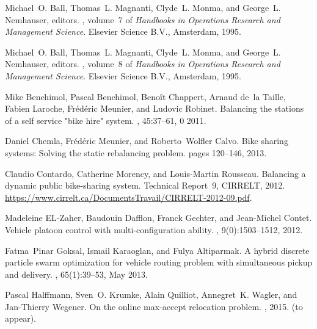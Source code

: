 \documentclass[english]{llncs}
\numberwithin{sublemma}{lemma}
\begin{document}
\begin{thebibliography}{10}

Michael~O. Ball, Thomas~L. Magnanti, Clyde~L. Monma, and George~L. Nemhauser,
  editors.
, volume~7 of {\em Handbooks in Operations
  Research and Management Science}.
\newblock Elsevier Science B.V., Amsterdam, 1995.

Michael~O. Ball, Thomas~L. Magnanti, Clyde~L. Monma, and George~L. Nemhauser,
  editors.
, volume~8 of {\em Handbooks in Operations
  Research and Management Science}.
\newblock Elsevier Science B.V., Amsterdam, 1995.

Mike Benchimol, Pascal Benchimol, Beno\^{i}t Chappert, Arnaud de~la Taille,
  Fabien Laroche, Fr\'{e}d\'{e}ric Meunier, and Ludovic Robinet.
\newblock Balancing the stations of a self service "bike hire" system.
, 45:37--61, 0 2011.

Daniel Chemla, Fr\'{e}d\'{e}ric Meunier, and Roberto~Wolfler Calvo.
\newblock Bike sharing systems: {S}olving the static rebalancing problem.
\newblock pages 120--146, 2013.

Claudio Contardo, Catherine Morency, and Louis-Martin Rousseau.
\newblock Balancing a dynamic public bike-sharing system.
\newblock Technical Report~9, CIRRELT, 2012.
\newblock \url{https://www.cirrelt.ca/DocumentsTravail/CIRRELT-2012-09.pdf}.

Madeleine EL-Zaher, Baudouin Dafflon, Franck Gechter, and Jean-Michel Contet.
\newblock Vehicle platoon control with multi-configuration ability.
, 9(0):1503--1512, 2012.

Fatma~Pinar Goksal, Ismail Karaoglan, and Fulya Altiparmak.
\newblock A hybrid discrete particle swarm optimization for vehicle routing
  problem with simultaneous pickup and delivery.
, 65(1):39--53, May 2013.

Pascal Halffmann, Sven~O. Krumke, Alain Quilliot, Annegret~K. Wagler, and
  Jan-Thierry Wegener.
\newblock On the online max-accept relocation problem.
, 2015.
\newblock (to appear).


\end{thebibliography}
\end{document}
